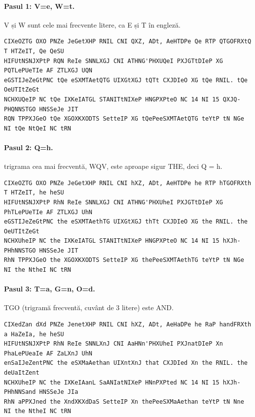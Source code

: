 \paragraph{Pasul 1: V=e, W=t.} V și W sunt cele mai frecvente litere, ca E și T în engleză.
\begin{lstlisting}[language={}]
CIXeOZTG OXO PNZe JeGetXHP RNIL CNI QXZ, ADt, AeHTDPe Qe RTP QTGOFRXtQ T HTZeIT, Qe QeSU
HIFUtNSNJXPtP RQN ReIe SNNLXGJ CNI ATHNG'PHXUQeI PXJGTtDIeP XG PQTLePUeTIe AF ZTLXGJ UQN
eGSTIJeZeGtPNC tQe eSXMTAetQTG UIXGtXGJ tQTt CXJDIeO XG tQe RNIL. tQe OeUTItZeGt
NCHXUQeIP NC tQe IXKeIATGL STANITtNIXeP HNGPXPteO NC 14 NI 15 QXJQ-PHQNNSTGO HNSSeJe JIT
RQN TPPXJGeO tQe XGOXKXODTS SetteIP XG tQePeeSXMTAetQTG teYtP tN NGe NI tQe NtQeI NC tRN
\end{lstlisting}

\paragraph{Pasul 2: Q=h.} trigrama cea mai frecventă, WQV, este aproape sigur THE, deci Q = h.
\begin{lstlisting}[language={}]
CIXeOZTG OXO PNZe JeGetXHP RNIL CNI hXZ, ADt, AeHTDPe he RTP hTGOFRXth T HTZeIT, he heSU
HIFUtNSNJXPtP RhN ReIe SNNLXGJ CNI ATHNG'PHXUheI PXJGTtDIeP XG PhTLePUeTIe AF ZTLXGJ UhN
eGSTIJeZeGtPNC the eSXMTAethTG UIXGtXGJ thTt CXJDIeO XG the RNIL. the OeUTItZeGt
NCHXUheIP NC the IXKeIATGL STANITtNIXeP HNGPXPteO NC 14 NI 15 hXJh-PHhNNSTGO HNSSeJe JIT
RhN TPPXJGeO the XGOXKXODTS SetteIP XG thePeeSXMTAethTG teYtP tN NGe NI the NtheI NC tRN
\end{lstlisting}

\paragraph{Pasul 3: T=a, G=n, O=d.} TGO (trigramă frecventă, cuvânt de 3 litere) este AND.
\begin{lstlisting}[language={}]
CIXedZan dXd PNZe JenetXHP RNIL CNI hXZ, ADt, AeHaDPe he RaP handFRXth a HaZeIa, he heSU
HIFUtNSNJXPtP RhN ReIe SNNLXnJ CNI AaHNn'PHXUheI PXJnatDIeP Xn PhaLePUeaIe AF ZaLXnJ UhN
enSaIJeZentPNC the eSXMaAethan UIXntXnJ that CXJDIed Xn the RNIL. the deUaItZent
NCHXUheIP NC the IXKeIAanL SaANIatNIXeP HNnPXPted NC 14 NI 15 hXJh-PHhNNSand HNSSeJe JIa
RhN aPPXJned the XndXKXdDaS SetteIP Xn thePeeSXMaAethan teYtP tN Nne NI the NtheI NC tRN
\end{lstlisting}

